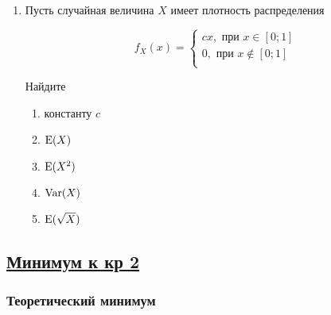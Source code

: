 \begin{enumerate}
\item Пусть случайная величина $X$ имеет плотность распределения

\[
f_X(x) =
	\begin{cases}
	cx,\text{ при }  x \in [0; 1] \\
	0,\text{ при } x \notin  [0; 1] \\
	\end{cases}
\]

Найдите
\begin{enumerate}
	\item константу $c$
	\item $\operatorname{E}(X)$
	\item $\operatorname{E}(X^2)$
	\item $\operatorname{Var}(X)$
	\item $\operatorname{E}(\sqrt{X})$
\end{enumerate}
\end{enumerate}


\subsection[Минимум к кр 2]{\hyperref[sec:sol_minimum_kr_02]{Минимум к кр 2}}
\label{sec:minimum_kr_02}



\subsubsection*{Теоретический минимум}


